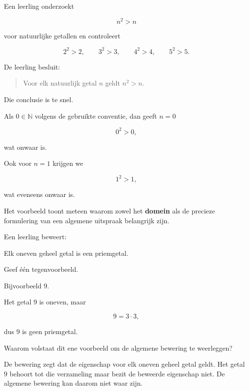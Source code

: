 \documentclass{ximera}
\begin{document}
\begin{voorbeeld}

Een leerling onderzoekt

\[
n^2>n
\]

voor natuurlijke getallen en controleert

\[
2^2>2,\qquad
3^2>3,\qquad
4^2>4,\qquad
5^2>5.
\]

De leerling besluit:

\begin{quote}
Voor elk natuurlijk getal $n$ geldt $n^2>n$.
\end{quote}

Die conclusie is te snel.

Als $0\in\mathbb{N}$ volgens de gebruikte conventie, dan geeft $n=0$

\[
0^2>0,
\]

wat onwaar is.

Ook voor $n=1$ krijgen we

\[
1^2>1,
\]

wat eveneens onwaar is.

Het voorbeeld toont meteen waarom zowel het \textbf{domein} als de
precieze formulering van een algemene uitspraak belangrijk zijn.
\end{voorbeeld}


\begin{oefening}{\oefB \ESS}

Een leerling beweert:

\begin{center}
Elk oneven geheel getal is een priemgetal.
\end{center}

\begin{question}
Geef één tegenvoorbeeld.

\begin{oplossing}
Bijvoorbeeld $9$.

Het getal $9$ is oneven, maar

\[
9=3\cdot3,
\]

dus $9$ is geen priemgetal.
\end{oplossing}
\end{question}

\begin{question}
Waarom volstaat dit ene voorbeeld om de algemene bewering te
weerleggen?

\begin{oplossing}
De bewering zegt dat de eigenschap voor elk oneven geheel getal geldt.
Het getal $9$ behoort tot die verzameling maar bezit de beweerde
eigenschap niet. De algemene bewering kan daarom niet waar zijn.
\end{oplossing}
\end{question}

\end{oefening}
\end{document}
